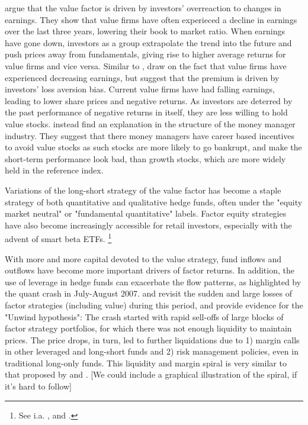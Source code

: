 \textcite{LakonishokShleiferVishny1994} argue that the value factor is driven by investors' overreaction to changes in earnings. They show that value firms have often experieced a decline in earnings over the last three years, lowering their book to market ratio. When earnings have gone down, investors as a group extrapolate the trend into the future and push prices away from fundamentals, giving rise to higher average returns for value firms and vice versa. Similar to \textcite{LakonishokShleiferVishny1994}, \textcite{BarberisHuang2001} draw on the fact that value firms have experienced decreasing earnings, but suggest that the premium is driven by investors' loss aversion bias. Current value firms have had falling earnings, leading to lower share prices and negative returns. As investors are deterred by the past performance of negative returns in itself, they are less willing to hold value stocks. \textcite{LakonishokShleiferVishny1992} instead find an explanation in the structure of the money manager industry. They suggest that there money managers have career based incentives to avoid value stocks as such stocks are more likely to go bankrupt, and make the short-term performance look bad, than growth stocks, which are more widely held in the reference index.

Variations of the long-short strategy of the value factor has become a staple strategy of both quantitative and qualitative hedge funds, often under the "equity market neutral" or "fundamental quantitative" labels. Factor equity strategies have also become increasingly accessible for retail investors, especially with the advent of smart beta ETFs. \footnote{See i.a. \textcite{Pedersen2015}, \textcite{AQREMN} and \textcite{McKEMN}.} 

With more and more capital devoted to the value strategy, fund inflows and outflows have become more important drivers of factor returns. In addition, the use of leverage in hedge funds can exacerbate the flow patterns, as highlighted by the quant crash in July-August 2007. \textcite{KhandaniLo2011} and \textcite{KhandaniLo2007} revisit the sudden and large losses of factor strategies (including value) during this period, and provide evidence for the "Unwind hypothesis": The crash started with rapid sell-offs of large blocks of factor strategy portfolios, for which there was not enough liquidity to maintain prices. The price drops, in turn, led to further liquidations due to 1) margin calls in other leveraged and long-short funds and 2) risk management policies, even in traditional long-only funds. This liquidity and margin spiral is very similar to that proposed by \textcite{Brunnermeier2009} and \textcite{BrunnermeierPedersen2009}. [We could include a graphical illustration of the spiral, if it's hard to follow]

